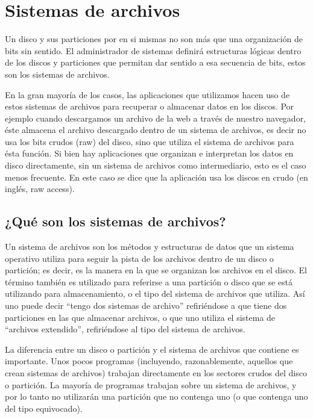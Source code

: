 \documentclass[12pt]{article}
\begin{document}
\section*{Sistemas de archivos}

Un disco y sus particiones por en si mismas no son más que una organización
de bits sin sentido. El administrador de sistemas definirá estructuras 
lógicas dentro de los discos y particiones que permitan dar sentido a esa
secuencia de bits, estos son los sistemas de archivos. 

En la gran mayoría de los casos, las aplicaciones que utilizamos hacen uso 
de estos sistemas de archivos para recuperar o almacenar datos en los 
discos. Por ejemplo cuando descargamos un archivo de la web a través de 
nuestro navegador, éste almacena el archivo descargado dentro de un 
sistema de archivos, es decir no usa los bits crudos (raw) del disco, sino 
que utiliza el sistema de archivos para ésta función. Si bien hay 
aplicaciones que organizan e interpretan los datos en disco directamente, 
sin un sistema de archivos como intermediario, esto es el caso menos 
frecuente. En este caso se dice que la aplicación usa los discos en crudo 
(en inglés, raw access). 

\subsection*{¿Qué son los sistemas de archivos?}

Un sistema de archivos son los métodos y estructuras de datos que un 
sistema operativo utiliza para seguir la pista de los archivos dentro de 
un disco o partición; es decir, es la manera en la que se organizan los 
archivos en el disco. El término también es utilizado para referirse a una
partición o disco que se está utilizando para almacenamiento, o el tipo del
sistema de archivos que utiliza. Así uno puede decir ``tengo dos sistemas 
de archivo'' refiriéndose a que tiene dos particiones en las que almacenar
archivos, o que uno utiliza el sistema de ``archivos extendido'', 
refiriéndose al tipo del sistema de archivos.

La diferencia entre un disco o partición y el sistema de archivos que 
contiene es importante. Unos pocos programas (incluyendo, razonablemente, 
aquellos que crean sistemas de archivos) trabajan directamente en los 
sectores crudos del disco o partición. La mayoría de 
programas trabajan sobre un sistema de archivos, y por lo tanto no 
utilizarán una partición que no contenga uno (o que contenga uno del tipo 
equivocado).
\end{document}

